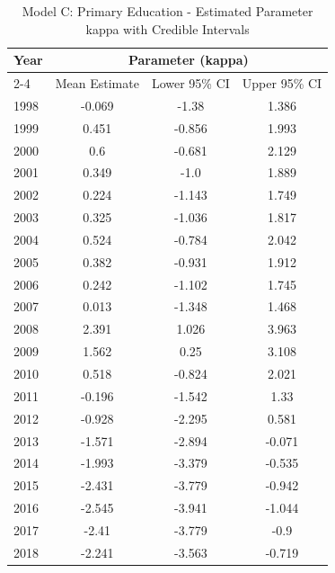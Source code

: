 \begin{landscape}
\begin{table}[htbp]
\centering
\caption{Model C: Primary Education - Estimated Parameter kappa  with Credible Intervals}
\label{tab:Fparameters_k10}
\begin{tabular}{@{}lccc@{}}
\toprule
Year & \multicolumn{3}{c}{Parameter (kappa)} \\
\cmidrule(lr){2-4}
      & Mean Estimate & Lower 95\% CI & Upper 95\% CI \\
\midrule
1998 & -0.069 & -1.38 & 1.386 \\
1999 & 0.451 & -0.856 & 1.993 \\
2000 & 0.6 & -0.681 & 2.129 \\
2001 & 0.349 & -1.0 & 1.889 \\
2002 & 0.224 & -1.143 & 1.749 \\
2003 & 0.325 & -1.036 & 1.817 \\
2004 & 0.524 & -0.784 & 2.042 \\
2005 & 0.382 & -0.931 & 1.912 \\
2006 & 0.242 & -1.102 & 1.745 \\
2007 & 0.013 & -1.348 & 1.468 \\
2008 & 2.391 & 1.026 & 3.963 \\
2009 & 1.562 & 0.25 & 3.108 \\
2010 & 0.518 & -0.824 & 2.021 \\
2011 & -0.196 & -1.542 & 1.33 \\
2012 & -0.928 & -2.295 & 0.581 \\
2013 & -1.571 & -2.894 & -0.071 \\
2014 & -1.993 & -3.379 & -0.535 \\
2015 & -2.431 & -3.779 & -0.942 \\
2016 & -2.545 & -3.941 & -1.044 \\
2017 & -2.41 & -3.779 & -0.9 \\
2018 & -2.241 & -3.563 & -0.719 \\
\bottomrule
\end{tabular}
\end{table}
\end{landscape}